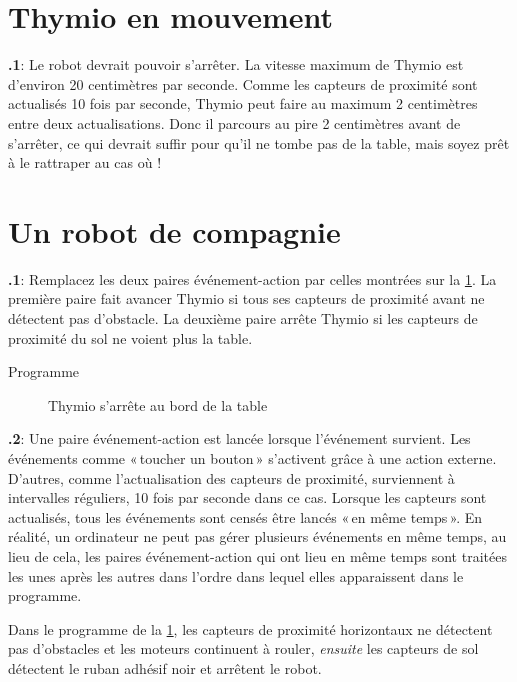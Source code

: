 \documentclass[12pt,a4paper,french]{article}
\begin{document}
\section{Thymio en mouvement}

\textbf{\thesection.1}: Le robot devrait pouvoir s'arrêter. La vitesse maximum de Thymio est d'environ 20 centimètres par seconde. Comme les capteurs de proximité sont actualisés 10 fois par seconde, Thymio peut faire au maximum 2 centimètres entre deux actualisations. Donc il parcours au pire 2 centimètres avant de s'arrêter, ce qui devrait suffir pour qu'il ne tombe pas de la table, mais soyez prêt à le rattraper au cas où !


\section{Un robot de compagnie}

\textbf{\thesection.1}: Remplacez les deux paires événement-action par celles montrées sur la \cref{fig.answer1}. La première paire fait avancer Thymio si tous ses capteurs de proximité avant ne détectent pas d'obstacle. La deuxième paire arrête Thymio si les capteurs de proximité du sol ne voient plus la table.

{\raggedleft \hfill Programme }

\begin{figure}[hbt]
\begin{center}
\caption{Thymio s'arrête au bord de la table}\label{fig.answer1}
\end{center}
\end{figure}

\textbf{\thesection.2}: Une paire événement-action est lancée lorsque l'événement survient. Les événements comme «\,toucher un bouton\,» s'activent grâce à une action externe. D'autres, comme l'actualisation des capteurs de proximité, surviennent à intervalles réguliers, 10 fois par seconde dans ce cas. Lorsque les capteurs sont actualisés, tous les événements sont censés être lancés «\,en même temps\,». En réalité, un ordinateur ne peut pas gérer plusieurs événements en même temps, au lieu de cela, les paires événement-action qui ont lieu en même temps sont traitées les unes après les autres dans l'ordre dans lequel elles apparaissent dans le programme.

Dans le programme de la \cref{fig.answer1}, les capteurs de proximité horizontaux ne détectent pas d'obstacles et les moteurs continuent à rouler, \emph{ensuite} les capteurs de sol détectent le ruban adhésif noir et arrêtent le robot.
\end{document}

